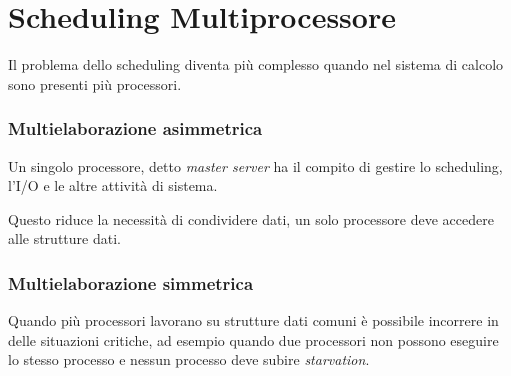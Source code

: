 \section{Scheduling Multiprocessore}
Il problema dello scheduling diventa più complesso quando nel sistema di calcolo sono presenti più processori.

\subsubsection*{Multielaborazione asimmetrica}
Un singolo processore, detto \textit{master server} ha il compito di gestire lo scheduling, l'I/O e le altre attività di sistema.

Questo riduce la necessità di condividere dati, un solo processore deve accedere alle strutture dati.

\subsubsection*{Multielaborazione simmetrica}
Quando più processori lavorano su strutture dati comuni è possibile incorrere in delle situazioni critiche, ad esempio quando due processori non possono eseguire lo stesso processo e nessun processo deve subire \textit{starvation}.

